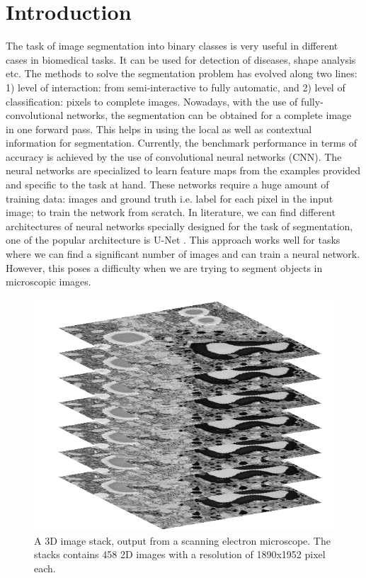 %


\chapter{Introduction}


The task of image segmentation into binary classes is very useful in different cases in biomedical tasks. It can be used for detection of diseases, shape analysis etc. The methods to solve the segmentation problem has evolved along two lines: 1) level of interaction: from semi-interactive to fully automatic, and 2) level of classification: pixels to complete images. Nowadays, with the use of fully-convolutional networks, the segmentation can be obtained for a complete image in one forward pass. This helps in using the local as well as contextual information for segmentation. Currently, the benchmark performance in terms of accuracy is achieved by the use of convolutional neural networks (CNN). The neural networks are specialized to learn feature maps from the examples provided and specific to the task at hand. These networks require a huge amount of training data: images and ground truth i.e. label for each pixel in the input image; to train the network from scratch. In literature, we can find different architectures of neural networks specially designed for the task of segmentation, one of the popular architecture is U-Net \cite{unet}. This approach works well for tasks where we can find a significant number of images and can train a neural network. However, this poses a difficulty when we are trying to segment objects in microscopic images.

\begin{figure}[h!] \label{fig:3dstack}
 \includegraphics[width=0.8\linewidth]{figures/3d_stack.png}
\caption{A 3D image stack, output from a scanning electron microscope.
The stacks contains 458 2D images with a resolution of 1890x1952 pixel each.}
\end{figure}

